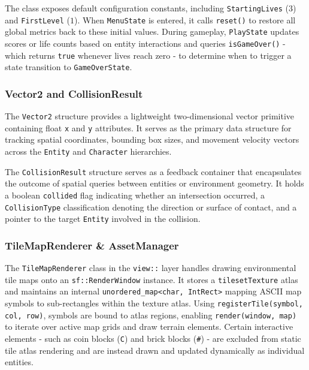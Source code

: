 \documentclass[12pt, a4paper]{article}
\begin{document}
The class exposes default configuration constants, including \texttt{StartingLives} ($3$) and \texttt{FirstLevel} ($1$). When \texttt{MenuState} is entered, it calls \texttt{reset()} to restore all global metrics back to these initial values. During gameplay, \texttt{PlayState} updates scores or life counts based on entity interactions and queries \texttt{isGameOver()} - which returns \texttt{true} whenever lives reach zero - to determine when to trigger a state transition to \texttt{GameOverState}.

\subsubsection{Vector2 and CollisionResult}

The \texttt{Vector2} structure provides a lightweight two-dimensional vector primitive containing float \texttt{x} and \texttt{y} attributes. It serves as the primary data structure for tracking spatial coordinates, bounding box sizes, and movement velocity vectors across the \texttt{Entity} and \texttt{Character} hierarchies.

The \texttt{CollisionResult} structure serves as a feedback container that encapsulates the outcome of spatial queries between entities or environment geometry. It holds a boolean \texttt{collided} flag indicating whether an intersection occurred, a \texttt{CollisionType} classification denoting the direction or surface of contact, and a pointer to the target \texttt{Entity} involved in the collision.

\newpage

\subsubsection{TileMapRenderer \& AssetManager}

The \texttt{TileMapRenderer} class in the \texttt{view::} layer handles drawing environmental tile maps onto an \texttt{sf::RenderWindow} instance. It stores a \texttt{tilesetTexture} atlas and maintains an internal \texttt{unordered\_map<char, IntRect>} mapping ASCII map symbols to sub-rectangles within the texture atlas. Using \texttt{registerTile(symbol, col, row)}, symbols are bound to atlas regions, enabling \texttt{render(window, map)} to iterate over active map grids and draw terrain elements. Certain interactive elements - such as coin blocks (\texttt{C}) and brick blocks (\texttt{\#}) - are excluded from static tile atlas rendering and are instead drawn and updated dynamically as individual entities.
\end{document}
